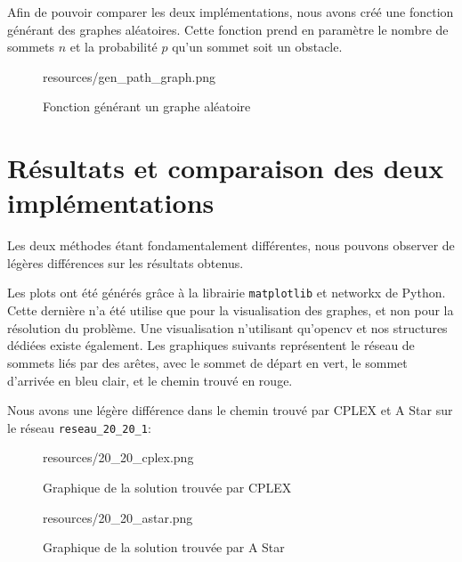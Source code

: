 Afin de pouvoir comparer les deux implémentations, nous avons créé une fonction générant des graphes aléatoires. Cette fonction prend en paramètre le nombre de sommets $n$ et la probabilité $p$ qu'un sommet soit un obstacle.

\begin{figure}[H]
    \centering
    \begin{includegraphics}[width=1\textwidth]{resources/gen_path_graph.png}
    \end{includegraphics}
    \caption{Fonction générant un graphe aléatoire}
    \label{fig:gen_path_graph}
\end{figure}

\section{Résultats et comparaison des deux implémentations}
\label{sec:shortest_path_comparison}

Les deux méthodes étant fondamentalement différentes, nous pouvons observer de légères différences sur les résultats obtenus.

Les plots ont été générés grâce à la librairie \texttt{matplotlib} et {networkx} de Python. Cette dernière n'a été utilise que pour la visualisation des graphes, et non pour la résolution du problème. Une visualisation n'utilisant qu'opencv et nos structures dédiées existe également.
Les graphiques suivants représentent le réseau de sommets liés par des arêtes, avec le sommet de départ en vert, le sommet d'arrivée en bleu clair, et le chemin trouvé en rouge.

Nous avons une légère différence dans le chemin trouvé par CPLEX et A Star sur le réseau \texttt{reseau\_20\_20\_1}:

\begin{figure}[H]
    \centering
    \begin{includegraphics}[width=.6\textwidth]{resources/20_20_cplex.png}
    \end{includegraphics}
    \caption{Graphique de la solution trouvée par CPLEX}
    \label{fig:cplex_2020}
\end{figure}

\begin{figure}[H]
    \centering
    \begin{includegraphics}[width=.6\textwidth]{resources/20_20_astar.png}
    \end{includegraphics}
    \caption{Graphique de la solution trouvée par A Star}
    \label{fig:astar_2020}
\end{figure}

